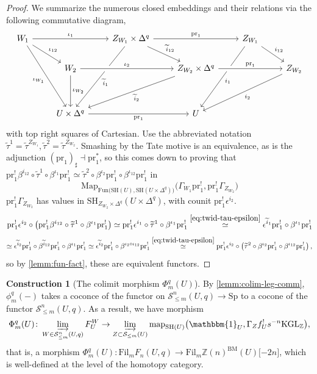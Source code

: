 \documentclass[11pt, twoside]{article}
\numberwithin{equation}{section}
\theoremstyle{definition}
\newtheorem{construction}[equation]{Construction}
\newcommand{\bb}[1]{\mathbb{#1}}
\newcommand{\colim}{\varinjlim}
\newcommand{\pr}{\mathrm{pr}}
\newcommand{\map}{\mathrm{map}}
\newcommand{\fil}{\mathrm{Fil}}
\newcommand{\Kgl}{\mathrm{KGL}}
\newcommand{\sh}{\mathrm{SH}}
\newcommand{\Sp}{\mathrm{Sp}}
\newcommand{\bm}{\mathrm{BM}}
\newcommand{\fun}{\mathrm{Fun}}
\newcommand{\Map}{\mathrm{Map}}
\begin{document}
\begin{proof}
We summarize the numerous closed embeddings and their relations via the following commutative diagram, 
\begin{equation}\label{eq:big-chungus-diagram}
\begin{tikzcd} W_1 \ar[dddr, "\iota_{W_1}", swap] \ar[dr, "\iota_{12}"] \ar[rr, "\iota_1"] & & Z_{W_1} \times \Delta^q \ar[dddl, "\tilde{i}_1"] \ar[dr, "\tilde{i}_{12}"] \ar[rr, "\pr_1"] & & Z_{W_1} \ar[dddl, "i_1"] \ar[dr, "i_{12}"]\\
& W_2 \ar[dd, "\iota_{W_2}"] \ar[rr, "\iota_2", crossing over] & & Z_{W_2} \ar[ddll, "\tilde{i}_2"] \times \Delta^q \ar[rr, "\pr_1", crossing over] & & Z_{W_2} \ar[ddll, "i_2"]\\
\\
& U \times \Delta^q \ar[rr, "\pr_1", swap] & & U\end{tikzcd}
\end{equation}
with top right squares of Cartesian. Use the abbreviated notation \(\tilde{\tau}^1 = \tilde{\tau}^{Z_{W_1}}, \tilde{\tau}^2 = \tilde{\tau}^{Z_{W_2}}\). Smashing by the Tate motive is an equivalence, as is the adjunction \((\pr_1)_\sharp \dashv \pr_1^*\), so this comes down to proving that \(\pr_1^! \beta^{i_{12}} \circ \tilde{\tau}^1 \circ \beta^{\iota_1}\pr_1^! \simeq \tilde{\tau}^2 \circ \beta^{\iota_2} \pr_1^! \circ \beta^{\iota_{12}}\pr_1^! \) in 
\[\Map_{\fun\big(\sh(U), \sh(U \times \Delta^q)\big)}\big(\Gamma_{W_1}\pr_1^!, \pr_1^! \Gamma_{Z_{W_2}}\big)\]
\(\pr_1^! \Gamma_{Z_{W_2}}\) has values in \(\sh_{Z_{W_2} \times \Delta^q}(U \times \Delta^q)\), with counit \(\pr_1^!\epsilon^{i_2}\).
\[\pr_1^! \epsilon^{i_2} \circ \left(\pr_1^! \beta^{i_{12}} \circ \tilde{\tau}^1 \circ \beta^{\iota_1}\pr_1^!\right) \simeq \pr_1^!\epsilon^{i_1} \circ \tilde{\tau}^1 \circ \beta^{\iota_1}\pr_1^! \stackrel{\eqref{eq:twid-tau-epsilon}} \simeq \epsilon^{\tilde{i}_1}\pr_1^! \circ \beta^{\iota_1}\pr_1^!\]
\[\simeq \epsilon^{\tilde{i}_2}\pr_1^! \circ \beta^{\tilde{i}_{12}}\pr_1^! \circ \beta^{\iota_1}\pr_1^! \simeq \epsilon^{\tilde{i}_2}\pr_1^! \circ \beta^{\iota_2 \circ \iota_{12}}\pr_1^! \stackrel{\eqref{eq:twid-tau-epsilon}} \simeq \pr_1^! \epsilon^{i_2} \circ \left(\tilde{\tau}^2 \circ \beta^{\iota_2}\pr_1^! \circ \beta^{\iota_{12}}\pr_1^!\right),\]
so by \ref{lemm:fun-fact}, these are equivalent functors.
\end{proof}

\begin{construction}[The colimit morphism \(\Phi_m^q(U)\)]\label{con:Phi-naive}
By \ref{lemm:colim-leg-comm}, \(\phi_m^q( - )\) takes a coconce of the functor on \(\mathcal{S}_{\leq m}^n(U, q) \to \Sp\) to a cocone of the functor \(\mathcal{S}_{\leq m}^n(U, q)\). As a result, we have morphism 
\[\Phi_m^q(U) \colon \colim_{W \in \mathcal{S}_{\leq m}^n(U, q)} F_U^W \to \colim_{Z \subset \mathcal{S}_{\leq m}(U)} \map_{\sh(U)}\big(\mathbbm{1}_U,\Gamma_Z f_U^! s^{- n} \Kgl_\bb{Z}\big),\]
that is, a morphism \(\Phi_m^q(U) \colon \fil_m F_n(U, q) \to \fil_m \bb{Z}(n)^\bm(U)\lbrack -2n\rbrack\), which is well-defined at the level of the homotopy category.
\end{construction}
\end{document}
